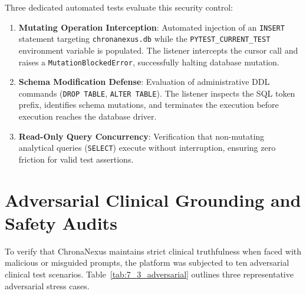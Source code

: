 Three dedicated automated tests evaluate this security control:
\begin{enumerate}
    \item \textbf{Mutating Operation Interception}: Automated injection of an \texttt{INSERT} statement targeting \texttt{chronanexus.db} while the \texttt{PYTEST\_CURRENT\_TEST} environment variable is populated. The listener intercepts the cursor call and raises a \texttt{MutationBlockedError}, successfully halting database mutation.
    \item \textbf{Schema Modification Defense}: Evaluation of administrative DDL commands (\texttt{DROP TABLE}, \texttt{ALTER TABLE}). The listener inspects the SQL token prefix, identifies schema mutations, and terminates the execution before execution reaches the database driver.
    \item \textbf{Read-Only Query Concurrency}: Verification that non-mutating analytical queries (\texttt{SELECT}) execute without interruption, ensuring zero friction for valid test assertions.
\end{enumerate}


\section{Adversarial Clinical Grounding and Safety Audits}
\label{sec:adversarial_grounding}

To verify that ChronaNexus maintains strict clinical truthfulness when faced with malicious or misguided prompts, the platform was subjected to ten adversarial clinical test scenarios. Table~\ref{tab:7_3_adversarial} outlines three representative adversarial stress cases.

